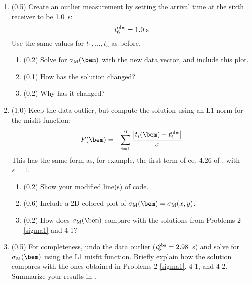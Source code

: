 \documentclass[11pt,titlepage,fleqn]{article}
\begin{document}
\begin{enumerate}
\item (0.5) Create an outlier measurement by setting the arrival time at the sixth receiver to be 1.0~s:
%
\begin{equation}
t_6^{\rm obs} = 1.0\;{\rm s}
\end{equation}
%
Use the same values for $t_1, \ldots, t_5$ as before.

\begin{enumerate}
\item (0.2) Solve for $\sigma_{\rm M}(\bem)$ with the new data vector, and include this plot.
\item (0.1) How has the solution changed?
\item (0.2) Why has it changed?
\end{enumerate}

\item (1.0) Keep the data outlier, but compute the solution using an L1 norm for the misfit function:
%
\begin{eqnarray}
F(\bem) &=& \sum_{i=1}^6 \frac{\left| t_i(\bem) - t_i^{\rm obs}\right|}{\sigma}
\end{eqnarray}
%
This has the same form as, for example, the first term of eq. 4.26 of \citet{Tarantola2005}, with $s=1$.

\begin{enumerate}
\item (0.2) Show your modified line(s) of code.
\item (0.6) Include a 2D colored plot of $\sigma_{\rm M}(\bem) = \sigma_{\rm M}(x,y)$.
\item (0.2) How does $\sigma_{\rm M}(\bem)$ compare with the solutions from Problems 2-\ref{sigma1} and 4-1?
\end{enumerate}

\item (0.5) For completeness, undo the data outlier ($t_6^{\rm obs} = 2.98$~s) and solve for $\sigma_{\rm M}(\bem)$ using the L1 misfit function.
Briefly explain how the solution compares with the ones obtained in Problems 2-\ref{sigma1}, 4-1, and 4-2.
Summarize your results in .

\end{enumerate}
\end{document}
